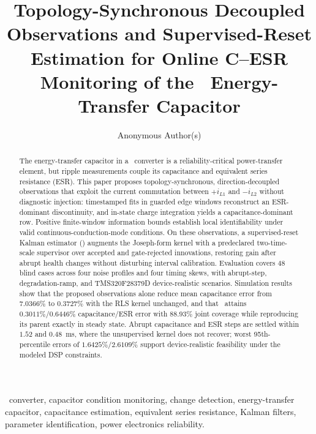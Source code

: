 \documentclass[journal]{IEEEtran}
\title{Topology-Synchronous Decoupled Observations and Supervised-Reset
Estimation for Online C--ESR Monitoring of the \Cuk\ Energy-Transfer
Capacitor}
\author{Anonymous Author(s)}
\begin{document}
\maketitle

\begin{abstract}
The energy-transfer capacitor in a \Cuk\ converter is a reliability-critical power-transfer element, but ripple measurements couple its capacitance and equivalent series resistance (ESR). This paper proposes topology-synchronous, direction-decoupled observations that exploit the current commutation between $+i_{L1}$ and $-i_{L2}$ without diagnostic injection: timestamped fits in guarded edge windows reconstruct an ESR-dominant discontinuity, and in-state charge integration yields a capacitance-dominant row. Positive finite-window information bounds establish local identifiability under valid continuous-conduction-mode conditions. On these observations, a supervised-reset Kalman estimator (\TSSRKE) augments the Joseph-form kernel with a predeclared two-time-scale supervisor over accepted and gate-rejected innovations, restoring gain after abrupt health changes without disturbing interval calibration. Evaluation covers 48 blind cases across four noise profiles and four timing skews, with abrupt-step, degradation-ramp, and TMS320F28379D device-realistic scenarios. Simulation results show that the proposed observations alone reduce mean capacitance error from $7.0366\%$ to $0.3727\%$ with the RLS kernel unchanged, and that \TSSRKE\ attains $0.3011\%/0.6446\%$ capacitance/ESR error with $88.93\%$ joint coverage while reproducing its parent exactly in steady state. Abrupt capacitance and ESR steps are settled within $1.52$ and $0.48$~ms, where the unsupervised kernel does not recover; worst 95th-percentile errors of $1.6425\%/2.6109\%$ support device-realistic feasibility under the modeled DSP constraints.
\end{abstract}

\begin{IEEEkeywords}
\Cuk\ converter, capacitor condition monitoring, change detection, energy-transfer capacitor, capacitance estimation, equivalent series resistance, Kalman filters, parameter identification, power electronics reliability.
\end{IEEEkeywords}












\appendices





\end{document}
